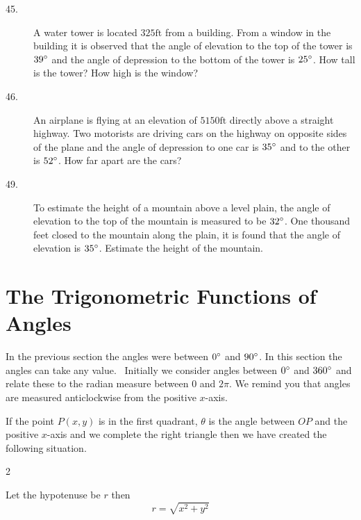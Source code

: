 \begin{description}
\item [45.]
A water tower is located $325 \mbox{ft}$ from a building. From a window in the building
it is observed that the angle of elevation to the top of the tower is $39 \mbox{{\ensuremath{{}^\circ}}}$ and the angle of depression to the bottom of the tower is $25 \mbox{{\ensuremath{{}^\circ}}}$. How tall is the tower? How
high is the window? 

\item [46.] An airplane is flying at an
elevation of $5150 \mbox{ft}$ directly above a straight highway. Two motorists
are driving cars on the highway on opposite sides of the plane and the angle of depression to one car is $35 \mbox{{\ensuremath{{}^\circ}}}$ and to the other is $52 \mbox{{\ensuremath{{}^\circ}}}$. How far apart are the cars? 

\item [49.]
To estimate the height of a mountain above a level plain, the angle of elevation to the top of the mountain is measured to be $32 \mbox{{\ensuremath{{}^\circ}}}$. One thousand feet closed to the mountain along
the plain, it is found that the angle of elevation is $35 \mbox{{\ensuremath{{}^\circ}}}$. Estimate the height of the mountain. \end{description}

 

\section{The Trigonometric Functions of Angles}


In the previous section the angles were between $0 \mbox{{\ensuremath{{}^\circ}}}$ and $90 \mbox{{\ensuremath{{}^\circ}}}$. In this section the angles can take any value.
\ Initially we consider angles between $0 \mbox{{\ensuremath{{}^\circ}}}$ and $360 \mbox{{\ensuremath{{}^\circ}}}$ and relate these to the radian measure between $0$ and $2 \pi $. We remind you that angles are measured anticlockwise from the positive $x$-axis. 

If the point $P (x ,y)$ is in the first quadrant, $\theta $ is the angle between $OP$ and the positive $x$-axis and we complete the right triangle then we have created the following situation.  
\columnsep =30pt
\begin {multicols}{2}
 

   
\setlength\fboxrule{0in}\setlength\fboxsep{0.2in}


Let the hypotenuse be $r$ then
\begin{equation*}r =\sqrt{x^{2} +y^{2}}
\end{equation*}


\end {multicols}


